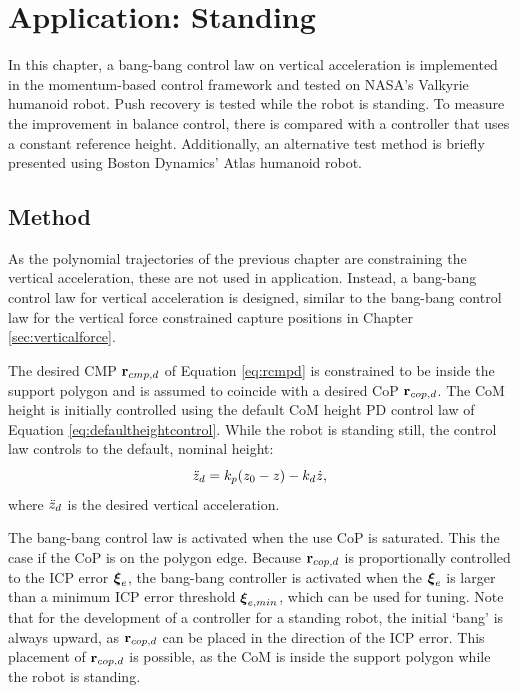 \chapter{Application: Standing}\label{chap:standing}
In this chapter, a bang-bang control law on vertical acceleration is implemented in the momentum-based control framework and tested on NASA's Valkyrie \cite{radford2015valkyrie} humanoid robot. Push recovery is tested while the robot is standing. To measure the improvement in balance control, there is compared with a controller that uses a constant reference height. Additionally, an alternative test method is briefly presented using Boston Dynamics' Atlas humanoid robot.

\section{Method}
As the polynomial trajectories of the previous chapter are constraining the vertical acceleration, these are not used in application. Instead, a bang-bang control law for vertical acceleration is designed, similar to the bang-bang control law for the vertical force constrained capture positions in Chapter \ref{sec:verticalforce}.

The desired \ac{CMP} $\mathbf{r}_{cmp,d}$ of Equation \eqref{eq:rcmpd} is constrained to be inside the support polygon and is assumed to coincide with a desired \ac{CoP} $\mathbf{r}_{cop,d}$. The \ac{CoM} height is initially controlled using the default \ac{CoM} height PD control law of Equation \eqref{eq:defaultheightcontrol}.  While the robot is standing still, the control law controls to the default, nominal height:
\begin{equation}
\ddot{z}_d =k_p(z_0-z) - k_d\dot{z},
\end{equation}
where $\ddot{z}_d$ is the desired vertical acceleration. 

The bang-bang control law is activated when the use \ac{CoP} is saturated. This the case if the \ac{CoP} is on the polygon edge. Because $\mathbf{r}_{cop,d}$ is proportionally controlled to the \ac{ICP} error $\boldsymbol{\xi}_e$, the bang-bang controller is activated when the $\boldsymbol{\xi}_e$ is larger than a minimum \ac{ICP} error threshold $\boldsymbol{\xi}_{e,min}$, which can be used for tuning. Note that for the development of a controller for a standing robot, the initial `bang' is always upward, as $\mathbf{r}_{cop,d}$ can be placed in the direction of the \ac{ICP} error. This placement of $\mathbf{r}_{cop,d}$ is possible, as the \ac{CoM} is inside the support polygon while the robot is standing.

